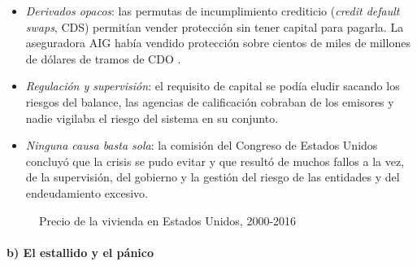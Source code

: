 \documentclass[11pt]{article}
\begin{document}
\begin{itemize}
\item \emph{Derivados opacos}: las permutas de incumplimiento crediticio (\emph{credit default swaps}, CDS) permitían vender protección sin tener capital para pagarla. La aseguradora AIG había vendido protección sobre cientos de miles de millones de dólares de tramos de CDO\nocite{Stulz2010Credit} .
\item \emph{Regulación y supervisión}: el requisito de capital se podía eludir sacando los riesgos del balance, las agencias de calificación cobraban de los emisores y nadie vigilaba el riesgo del sistema en su conjunto.
\item \emph{Ninguna causa basta sola}: la comisión del Congreso de Estados Unidos concluyó que la crisis se pudo evitar y que resultó de muchos fallos a la vez, de la supervisión, del gobierno y la gestión del riesgo de las entidades y del endeudamiento excesivo\nocite{FCIC2011Report}.
\end{itemize}

\begin{figure}[H]
\centering
\caption{Precio de la vivienda en Estados Unidos, 2000-2016}\label{fig:vivienda-eeuu}
\end{figure}

\paragraph{b) El estallido y el pánico}
\end{document}
